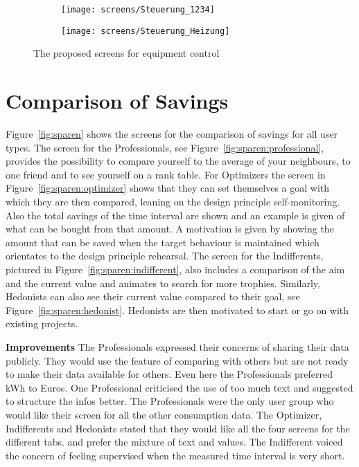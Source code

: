 \begin{figure}[h]
	\centering
	\begin{subfigure}[b]{0.24\columnwidth}
		\centering
		\texttt{[image: screens/Steuerung\_1234]}
		\label{fig:equipment:overview}
	\end{subfigure}
	\begin{subfigure}[b]{0.24\columnwidth}
		\centering
		\texttt{[image: screens/Steuerung\_Heizung]}
		\label{fig:equipment:profile}
	\end{subfigure}
	\caption{The proposed screens for equipment control}
	\label{fig:equipmentcontrol} %
\end{figure}

\section{Comparison of Savings}

Figure~\ref{fig:sparen} shows the screens for the comparison of savings for all user types. The screen for the Professionals, see Figure~\ref{fig:sparen:professional}, provides the possibility to compare yourself to the average of your neighbours, to one friend and to see yourself on a rank table. For Optimizers the screen in Figure~\ref{fig:sparen:optimizer} shows that they can set themselves a goal with which they are then compared, leaning on the design principle self-monitoring. Also the total savings of the time interval are shown and an example is given of what can be bought from that amount. A motivation is given by showing the amount that can be saved when the target behaviour is maintained which orientates to the design principle rehearsal. The screen for the Indifferents, pictured in Figure~\ref{fig:sparen:indifferent}, also includes a comparison of the aim and the current value and animates to search for more trophies. Similarly, Hedonists can also see their current value compared to their goal, see Figure~\ref{fig:sparen:hedonist}. Hedonists are then motivated to start or go on with existing projects.

\textbf{Improvements} \quad The Professionals expressed their concerns of sharing their data publicly. They would use the feature of comparing with others but are not ready to make their data available for others. Even here the Professionals preferred kWh to Euros. One Professional criticised the use of too much text and suggested to structure the infos better. The Professionals were the only user group who would like their screen for all the other consumption data. The Optimizer, Indifferents and Hedonists stated that they would like all the four screens for the different tabs. and prefer the mixture of text and values. The Indifferent voiced the concern of feeling supervised when the measured time interval is very short.

